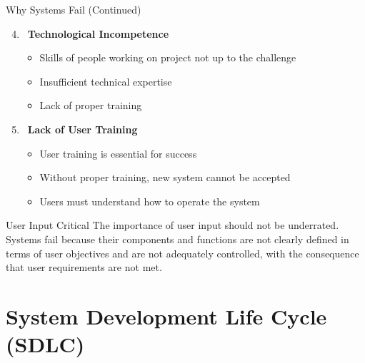 \documentclass[aspectratio=169]{beamer}
\begin{document}
\begin{frame}{Why Systems Fail (Continued)}
    \begin{enumerate}
        \setcounter{enumi}{3}
        \item\, \textbf{Technological Incompetence}
        \begin{itemize}
            \item Skills of people working on project not up to the challenge
            \item Insufficient technical expertise
            \item Lack of proper training
        \end{itemize}
        
        \item\, \textbf{Lack of User Training}
        \begin{itemize}
            \item User training is essential for success
            \item Without proper training, new system cannot be accepted
            \item Users must understand how to operate the system
        \end{itemize}
    \end{enumerate}
    
    \vspace{0.5cm}
    \begin{alertblock}{User Input Critical}
        The importance of user input should not be underrated. Systems fail because their components and functions are not clearly defined in terms of user objectives and are not adequately controlled, with the consequence that user requirements are not met.
    \end{alertblock}
\end{frame}

\section{System Development Life Cycle (SDLC)}
\end{document}
